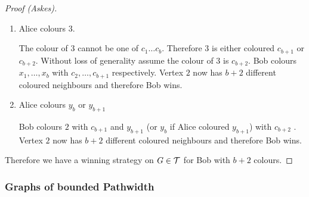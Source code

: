 \begin{proof}[Proof (Askes)]
\begin{enumerate}
        \item Alice colours $3$.
               
        The colour of $3$ cannot be one of $c_1 \ldots c_{b}$. Therefore $3$ is either coloured $c_{b+1}$ or $c_{b+2}$. 
        Without loss of generality assume the colour of $3$ is $c_{b+2}$.
        Bob colours $x_1, \dots ,x_{b}$ with $c_2,\dots,c_{b+1}$ respectively.
        Vertex $2$ now has $b+2$ different coloured neighbours and therefore Bob wins.  
                       
        \item Alice colours $y_{b}$ or $y_{b+1}$
        
        Bob colours $2$ with $c_{b+1}$ and $y_{b+1}$ (or $y_{b}$ if Alice coloured $y_{b+1}$) with $c_{b+2}$ .
        Vertex $2$ now has $b+2$ different coloured neighbours and therefore Bob wins. 
    \end{enumerate}

    Therefore we have a winning strategy on $G \in\mathcal{T}$ for Bob with $b+2$ colours. 
\end{proof}

\subsubsection{Graphs of bounded Pathwidth}

